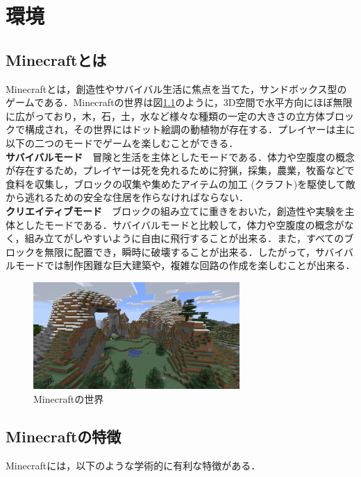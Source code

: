 \chapter{環境}	
\thispagestyle{plain}   %

\section{Minecraftとは}\label{sec:minecraft}
Minecraftとは，創造性やサバイバル生活に焦点を当てた，サンドボックス型のゲームである．Minecraftの世界は図\ref{fig:mc_world}のように，3D空間で水平方向にほぼ無限に広がっており，木，石，土，水など様々な種類の一定の大きさの立方体ブロックで構成され，その世界にはドット絵調の動植物が存在する．プレイヤーは主に以下の二つのモードでゲームを楽しむことができる．\\

\textbf{サバイバルモード}　冒険と生活を主体としたモードである．体力や空腹度の概念が存在するため，プレイヤーは死を免れるために狩猟，採集，農業，牧畜などで食料を収集し，ブロックの収集や集めたアイテムの加工 (クラフト)を駆使して敵から逃れるための安全な住居を作らなければならない．\\

\textbf{クリエイティブモード}　ブロックの組み立てに重きをおいた，創造性や実験を主体としたモードである．サバイバルモードと比較して，体力や空腹度の概念がなく，組み立てがしやすいように自由に飛行することが出来る．また，すべてのブロックを無限に配置でき，瞬時に破壊することが出来る．したがって，サバイバルモードでは制作困難な巨大建築や，複雑な回路の作成を楽しむことが出来る．\\
\begin{figure}[H]
    \centering
    \includegraphics[width=0.7\textwidth]{fig/minecraft_world.png}
    \caption{Minecraftの世界}
    \label{fig:mc_world}
\end{figure}

\section{Minecraftの特徴}
Minecraftには，以下のような学術的に有利な特徴がある．\\

